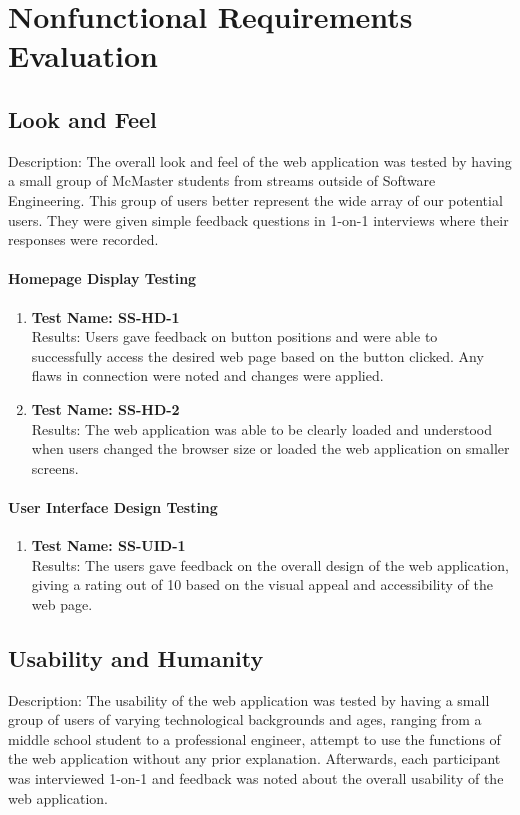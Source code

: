 \documentclass[11pt]{article}
\begin{document}
\section{Nonfunctional Requirements Evaluation}

\subsection{Look and Feel}
Description: The overall look and feel of the web application was tested by having a small group of McMaster students from streams outside of Software Engineering. This group of users better represent the wide array of our potential users. They were given simple feedback questions in 1-on-1 interviews where their responses were recorded.

\paragraph{Homepage Display Testing}
\begin{enumerate}
    \item \textbf{Test Name: SS-HD-1}\\
    Results: Users gave feedback on button positions and were able to successfully access the desired web page based on the button clicked. Any flaws in connection were noted and changes were applied.
    
    \item \textbf{Test Name: SS-HD-2}\\
    Results: The web application was able to be clearly loaded and understood when users changed the browser size or loaded the web application on smaller screens.
\end{enumerate}

\paragraph{User Interface Design Testing}
\begin{enumerate}
    \item \textbf{Test Name: SS-UID-1}\\
    Results: The users gave feedback on the overall design of the web application, giving a rating out of 10 based on the visual appeal and accessibility of the web page.
\end{enumerate}
		
\subsection{Usability and Humanity}
Description: The usability of the web application was tested by having a small group of users of varying technological backgrounds and ages, ranging from a middle school student to a professional engineer, attempt to use the functions of the web application without any prior explanation. Afterwards, each participant was interviewed 1-on-1 and feedback was noted about the overall usability of the web application.
\end{document}
